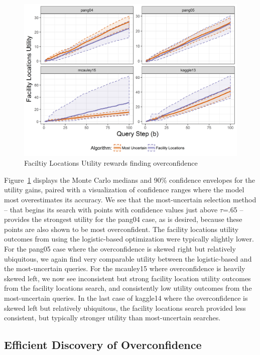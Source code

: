 \documentclass[letterpaper]{article} %
\begin{document}
\begin{figure}[t]
 \centering
  \includegraphics[width=\textwidth]{../experimentsAndPlots/flUtilPlaceholder.png}
  \caption{Faciltiy Locations Utility rewards finding overconfidence}
  \label{fig:flutil}
\end{figure}

Figure~\ref{fig:flutil} displays the Monte Carlo medians and 90\% confidence envelopes for the utility gains, paired with a visualization of confidence ranges where the model most overestimates its accuracy. We see that the most-uncertain selection method – that begins its search with points with confidence values just above $\tau$=.65 – provides the strongest utility for the pang04 case, as is desired, because these points are also shown to be most overconfident. The facility locations utility outcomes from using the logistic-based optimization were typically slightly lower. For the pang05 case where the overconfidence is skewed right but relatively ubiquitous, we again find very comparable utility between the logistic-based and the most-uncertain queries. For the mcauley15 where overconfidence is heavily skewed left, we now see inconsistent but strong facility location utility outcomes from the facility locations search, and consistently low utility outcomes from the most-uncertain queries. In the last case of kaggle14 where the overconfidence is skewed left but relatively ubiquitous, the facility locations search provided less consistent, but typically stronger utility than most-uncertain searches. 

\subsection{Efficient Discovery of Overconfidence}
\end{document}
